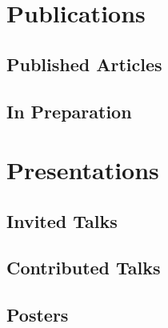 \documentclass{cv}
\begin{document}
\section{Publications}



\subsection*{Published Articles}
\cvArticles

\subsection*{In Preparation}
\cvInvitedArticles

\section{Presentations}

\subsection*{Invited Talks}
\cvInvitedTalks

\subsection*{Contributed Talks}
\cvContributedTalks

\subsection*{Posters}
\cvPosters

\end{document}
